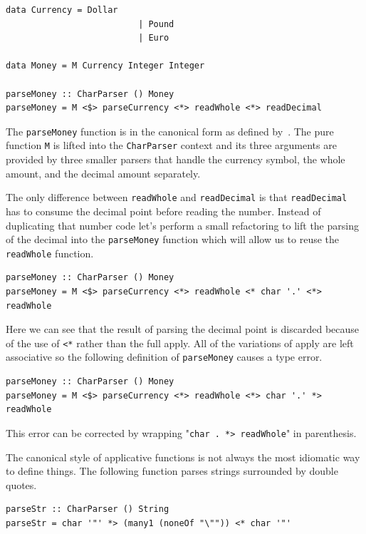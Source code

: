  \begin{lstlisting}[frame=tblr]
 data Currency = Dollar
                          | Pound
                          | Euro
              
data Money = M Currency Integer Integer

parseMoney :: CharParser () Money
parseMoney = M <$> parseCurrency <*> readWhole <*> readDecimal
 \end{lstlisting}
 
The \texttt{parseMoney} function is in the canonical form as defined by~\citep{mcbrideIdioms}. The pure function \texttt{M} is lifted into the \texttt{CharParser} context and its three arguments are provided by three smaller parsers that handle the currency symbol, the whole amount, and the decimal amount separately. 

The only difference between \texttt{readWhole} and \texttt{readDecimal} is that \texttt{readDecimal} has to consume the decimal point before reading the number. Instead of duplicating that number code let's perform a small refactoring to lift the parsing of the decimal into the \texttt{parseMoney} function which will allow us to reuse the \texttt{readWhole} function.

 \begin{lstlisting}[frame=tblr]
parseMoney :: CharParser () Money
parseMoney = M <$> parseCurrency <*> readWhole <* char '.' <*> readWhole
 \end{lstlisting}
 
 Here we can see that the result of parsing the decimal point is discarded because of the use of \texttt{<*} rather than the full apply. All of the variations of apply are left associative so the following definition of \texttt{parseMoney} causes a type error.
 
  \begin{lstlisting}[frame=tblr]
parseMoney :: CharParser () Money
parseMoney = M <$> parseCurrency <*> readWhole <*> char '.' *> readWhole
 \end{lstlisting}
 
This error can be corrected by wrapping "\texttt{char \textquotesingle.\textquotesingle~*> readWhole}" in parenthesis. 
 
The canonical style of applicative functions is not always the most idiomatic way to define things. The following function parses strings surrounded by double quotes.

\begin{lstlisting}[frame=tblr]
parseStr :: CharParser () String 
parseStr = char '"' *> (many1 (noneOf "\"")) <* char '"'
\end{lstlisting}

